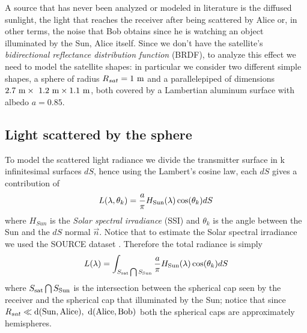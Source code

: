 \documentclass[twocolumn]{article}
\begin{document}
	A source that has never been analyzed or modeled in literature is the diffused sunlight, the light that reaches the receiver after being scattered by Alice or, in other terms, the noise that Bob obtains since he is watching an object illuminated by the Sun, Alice itself.
	Since we don't have the satellite's \textit{bidirectional reflectance distribution function} (BRDF), to analyze this effect we need to model the satellite shapes: in particular we consider two different simple shapes, a sphere of radius $R_{sat}= 1\ {\rm m}$ and a parallelepiped of dimensions ${\rm 2.7\ m\times\ 1.2\ m\times 1.1\ m}$, both covered by a Lambertian aluminum surface with albedo $a = 0.85$. 
	
	\subsection{Light scattered by the sphere}
	To model the scattered light radiance we divide the transmitter surface in k infinitesimal surfaces $dS$, hence using the Lambert's cosine law, each $dS$ gives a contribution of 
	\[
	L(\lambda,\theta_k) = \frac{a}{\pi}H_{\rm Sun}(\lambda) \cos(\theta_k)dS
	\]
	where $H_{Sun}$ is the \textit{Solar spectral irradiance} (SSI) and $\theta_k$ is the angle between the Sun and the $dS$ normal $\vec{n}$. Notice that to estimate the Solar spectral irradiance we used the SOURCE dataset \cite{SOURCEdataset}.
	Therefore the total radiance is simply
	\begin{equation}\label{eq:generalEq}
	L(\lambda) = \int_{S_{\rm sat}\bigcap S_{\rm Sun}} \frac{a}{\pi}H_{\rm Sun}(\lambda) \cos(\theta_k)dS
	\end{equation}
	where $S_{\rm sat}\bigcap S_{\rm Sun}$ is the intersection between the spherical cap seen by the receiver and the spherical cap that illuminated by the Sun; notice that since $R_{sat}\ll {\rm d(Sun,Alice),\ d(Alice,Bob)}$ both the spherical caps are approximately hemispheres.
	
\end{document}
